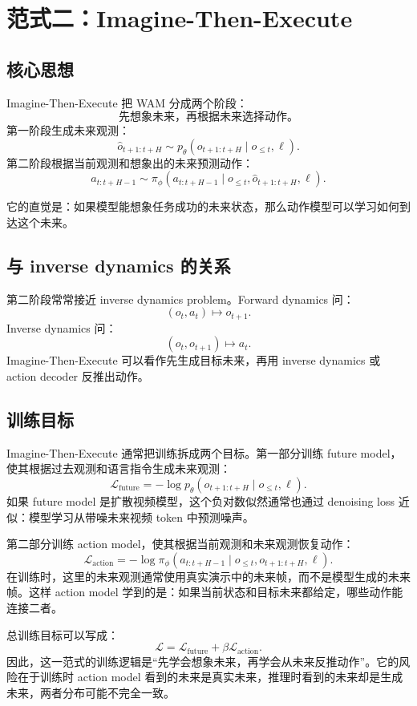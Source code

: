 \documentclass[11pt,a4paper]{ctexart}
\begin{document}
\section{范式二：Imagine-Then-Execute}

\subsection{核心思想}

Imagine-Then-Execute 把 WAM 分成两个阶段：
\[
  \text{先想象未来，再根据未来选择动作。}
\]
第一阶段生成未来观测：
\[
  \hat{o}_{t+1:t+H}
  \sim
  p_\theta(o_{t+1:t+H}\mid o_{\le t},\ell).
\]
第二阶段根据当前观测和想象出的未来预测动作：
\[
  a_{t:t+H-1}
  \sim
  \pi_\phi(a_{t:t+H-1}\mid o_{\le t},\hat{o}_{t+1:t+H},\ell).
\]

它的直觉是：如果模型能想象任务成功的未来状态，那么动作模型可以学习如何到达这个未来。

\subsection{与 inverse dynamics 的关系}

第二阶段常常接近 inverse dynamics problem。Forward dynamics 问：
\[
  (o_t,a_t)\mapsto o_{t+1}.
\]
Inverse dynamics 问：
\[
  (o_t,o_{t+1})\mapsto a_t.
\]
Imagine-Then-Execute 可以看作先生成目标未来，再用 inverse dynamics 或 action decoder 反推出动作。

\subsection{训练目标}

Imagine-Then-Execute 通常把训练拆成两个目标。第一部分训练 future model，使其根据过去观测和语言指令生成未来观测：
\[
  \mathcal{L}_{\mathrm{future}}
  =
  -\log p_\theta(o_{t+1:t+H}\mid o_{\le t},\ell).
\]
如果 future model 是扩散视频模型，这个负对数似然通常也通过 denoising loss 近似：模型学习从带噪未来视频 token 中预测噪声。

第二部分训练 action model，使其根据当前观测和未来观测恢复动作：
\[
  \mathcal{L}_{\mathrm{action}}
  =
  -\log \pi_\phi(a_{t:t+H-1}\mid o_{\le t},o_{t+1:t+H},\ell).
\]
在训练时，这里的未来观测通常使用真实演示中的未来帧，而不是模型生成的未来帧。这样 action model 学到的是：如果当前状态和目标未来都给定，哪些动作能连接二者。

总训练目标可以写成：
\[
  \mathcal{L}
  =
  \mathcal{L}_{\mathrm{future}}
  +
  \beta\mathcal{L}_{\mathrm{action}}.
\]
因此，这一范式的训练逻辑是“先学会想象未来，再学会从未来反推动作”。它的风险在于训练时 action model 看到的未来是真实未来，推理时看到的未来却是生成未来，两者分布可能不完全一致。
\end{document}
